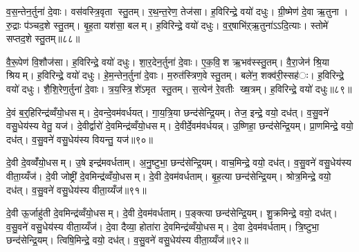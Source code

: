 
व॒स॒न्तेन॒र्तुना॑ दे॒वाः। वस॑वस्त्रि॒वृता स्तु॒तम्। र॒थ॒न्त॒रेण॒ तेज॑सा। ह॒विरिन्द्रे॒ वयो॑ दधुः। ग्री॒ष्मेण॑ दे॒वा ऋ॒तुना। रु॒द्राः प॑ञ्चद॒शे स्तु॒तम्। बृ॒ह॒ता यश॑सा॒ बलम्। ह॒विरिन्द्रे॒ वयो॑ दधुः। व॒र्॒षाभि॑ऱ्ऋ॒तुना॑ऽऽदि॒त्याः। स्तोमे॑ सप्तद॒शे स्तु॒तम्॥८८॥

वै॒रू॒पेण॑ वि॒शौज॑सा। ह॒विरिन्द्रे॒ वयो॑ दधुः। शा॒र॒देन॒र्तुना॑ दे॒वाः। ए॒क॒वि॒श ऋ॒भव॑स्स्तु॒तम्। वै॒रा॒जेन॑ श्रि॒या श्रियम्। ह॒विरिन्द्रे॒ वयो॑ दधुः। हे॒म॒न्तेन॒र्तुना॑ दे॒वाः। म॒रुत॑स्त्रिण॒वे स्तु॒तम्। बले॑न॒ शक्व॑री॒स्सह॑ः। ह॒विरिन्द्रे॒ वयो॑ दधुः। शै॒शि॒रेण॒र्तुना॑ दे॒वाः। त्र॒य॒स्त्रि॒शे॑ऽमृत स्तु॒तम्। स॒त्येन॑ रे॒वतीः ख्ष॒त्रम्। ह॒विरिन्द्रे॒ वयो॑ दधुः॥८९॥


दे॒वं ब॒र्॒हिरिन्द्र॑व्वँयो॒धसम्। दे॒वन्दे॒वम॑वर्धयत्। गा॒य॒त्रि॒या छन्द॑सेन्द्रि॒यम्। तेज॒ इन्द्रे॒ वयो॒ दध॑त्। व॒सु॒वने॑ वसु॒धेय॑स्य वेतु॒ यज॑। दे॒वीर्द्वारो॑ दे॒वमिन्द्र॑व्वँयो॒धसम्। दे॒वीर्दे॒वम॑वर्धयन्न्। उ॒ष्णिहा॒ छन्द॑सेन्द्रि॒यम्। प्रा॒णमिन्द्रे॒ वयो॒ दध॑त्। व॒सु॒वने॑ वसु॒धेय॑स्य वियन्तु॒ यज॑॥९०॥

दे॒वी दे॒वव्वँ॑यो॒धसम्। उ॒षे इन्द्र॑मवर्धताम्। अ॒नु॒ष्टुभा॒ छन्द॑सेन्द्रि॒यम्। वाच॒मिन्द्रे॒ वयो॒ दध॑त्। व॒सु॒वने॑ वसु॒धेय॑स्य वीता॒य्यँज॑। दे॒वी जोष्ट्री॑ दे॒वमिन्द्र॑व्वँयो॒धसम्। दे॒वी दे॒वम॑वर्धताम्। बृ॒ह॒त्या छन्द॑सेन्द्रि॒यम्। श्रोत्र॒मिन्द्रे॒ वयो॒ दध॑त्। व॒सु॒वने॑ वसु॒धेय॑स्य वीता॒य्यँज॑॥९१॥

दे॒वी ऊ॒र्जाहु॑ती दे॒वमिन्द्र॑व्वँयो॒धसम्। दे॒वी दे॒वम॑वर्धताम्। प॒ङ्क्त्या छन्द॑सेन्द्रि॒यम्। शु॒क्रमिन्द्रे॒ वयो॒ दध॑त्। व॒सु॒वने॑ वसु॒धेय॑स्य वीता॒य्यँज॑। दे॒वा दैव्या॒ होता॑रा दे॒वमिन्द्र॑व्वँयो॒धसम्। दे॒वा दे॒वम॑वर्धताम्। त्रि॒ष्टुभा॒ छन्द॑सेन्द्रि॒यम्। त्विषि॒मिन्द्रे॒ वयो॒ दध॑त्। व॒सु॒वने॑ वसु॒धेय॑स्य वीता॒य्यँज॑॥९२॥

